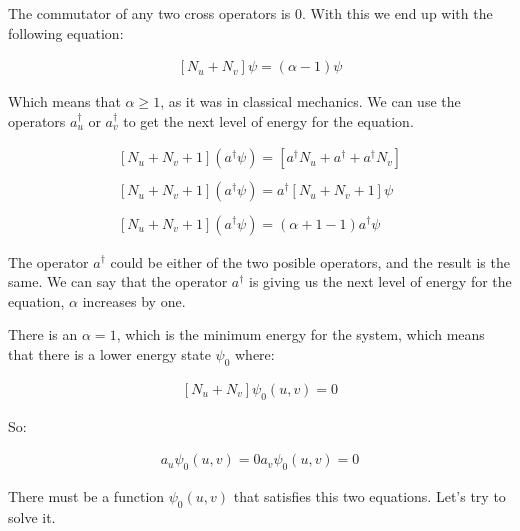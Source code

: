 The commutator of any two cross operators is 0. With this we end up with the following equation:

\begin{equation}
  \begin{array}{c}
    \left[N_u+N_v\right] \psi = (\alpha-1) \psi
  \end{array}
\end{equation}

Which means that $\alpha \geq 1$, as it was in classical mechanics. We can use the operators $a_u^{\dagger}$ or $a_v^{\dagger}$ to get the next level of energy for the equation.

\begin{equation}
  \begin{array}{c}
      \left[N_u+N_v+1\right] (a^{\dagger}\psi) = \left[a^{\dagger}N_u + a^{\dagger} + a^{\dagger}N_v \right]
      \\

      \\
      \left[N_u+N_v+1\right] (a^{\dagger}\psi) = a^{\dagger}[N_u+N_v+1]\psi
      \\

      \\
      \left[N_u+N_v+1\right] (a^{\dagger}\psi) = (\alpha+1-1)a^{\dagger}\psi
  \end{array}
\end{equation}

The operator $a^{\dagger}$ could be either of the two posible operators, and the result is the same. We can say that the operator $a^{\dagger}$ is giving us the next level of energy for the equation, $\alpha$ increases by one.

There is an $\alpha = 1$, which is the minimum energy for the system, which means that there is a lower energy state $\psi_0$ where:

\begin{equation}
  \begin{array}{c}
    \left[N_u+N_v\right] \psi_0(u,v) = 0
  \end{array}
\end{equation}

So:

\begin{equation}
  \begin{array}{c}
    a_u \psi_0(u,v) = 0
    a_v \psi_0(u,v) = 0
  \end{array}
\end{equation}

There must be a function $\psi_0(u,v)$ that satisfies this two equations. Let's try to solve it.

